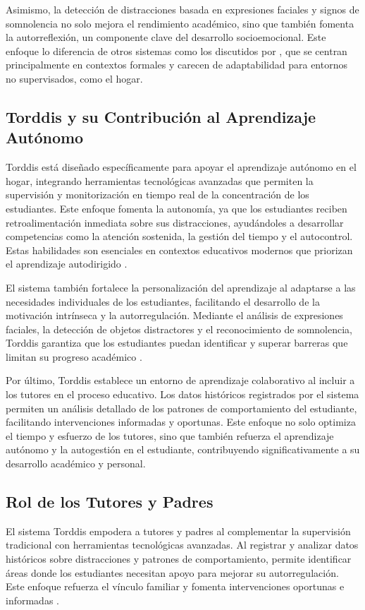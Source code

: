 \documentclass[a4paper,fleqn]{cas-sc}
\begin{document}
			Asimismo, la detección de distracciones basada en expresiones faciales y signos de somnolencia no solo mejora el rendimiento académico, sino que también fomenta la autorreflexión, un componente clave del desarrollo socioemocional. Este enfoque lo diferencia de otros sistemas como los discutidos por \cite{Ackermans2025Young,Berrezueta-Guzman2021,Wang2022Empowering}, que se centran principalmente en contextos formales y carecen de adaptabilidad para entornos no supervisados, como el hogar.
		
		\subsection{Torddis y su Contribución al Aprendizaje Autónomo}
			Torddis está diseñado específicamente para apoyar el aprendizaje autónomo en el hogar, integrando herramientas tecnológicas avanzadas que permiten la supervisión y monitorización en tiempo real de la concentración de los estudiantes. Este enfoque fomenta la autonomía, ya que los estudiantes reciben retroalimentación inmediata sobre sus distracciones, ayudándoles a desarrollar competencias como la atención sostenida, la gestión del tiempo y el autocontrol. Estas habilidades son esenciales en contextos educativos modernos que priorizan el aprendizaje autodirigido \citep{Li2024Systematic}.
		
			El sistema también fortalece la personalización del aprendizaje al adaptarse a las necesidades individuales de los estudiantes, facilitando el desarrollo de la motivación intrínseca y la autorregulación. Mediante el análisis de expresiones faciales, la detección de objetos distractores y el reconocimiento de somnolencia, Torddis garantiza que los estudiantes puedan identificar y superar barreras que limitan su progreso académico \citep{Ackermans2025Young}.
		
			Por último, Torddis establece un entorno de aprendizaje colaborativo al incluir a los tutores en el proceso educativo. Los datos históricos registrados por el sistema permiten un análisis detallado de los patrones de comportamiento del estudiante, facilitando intervenciones informadas y oportunas. Este enfoque no solo optimiza el tiempo y esfuerzo de los tutores, sino que también refuerza el aprendizaje autónomo y la autogestión en el estudiante, contribuyendo significativamente a su desarrollo académico y personal.
		
		\subsection{Rol de los Tutores y Padres}
			El sistema Torddis empodera a tutores y padres al complementar la supervisión tradicional con herramientas tecnológicas avanzadas. Al registrar y analizar datos históricos sobre distracciones y patrones de comportamiento, permite identificar áreas donde los estudiantes necesitan apoyo para mejorar su autorregulación. Este enfoque refuerza el vínculo familiar y fomenta intervenciones oportunas e informadas \citep{Loh2025Plugging}.
		
\end{document}
